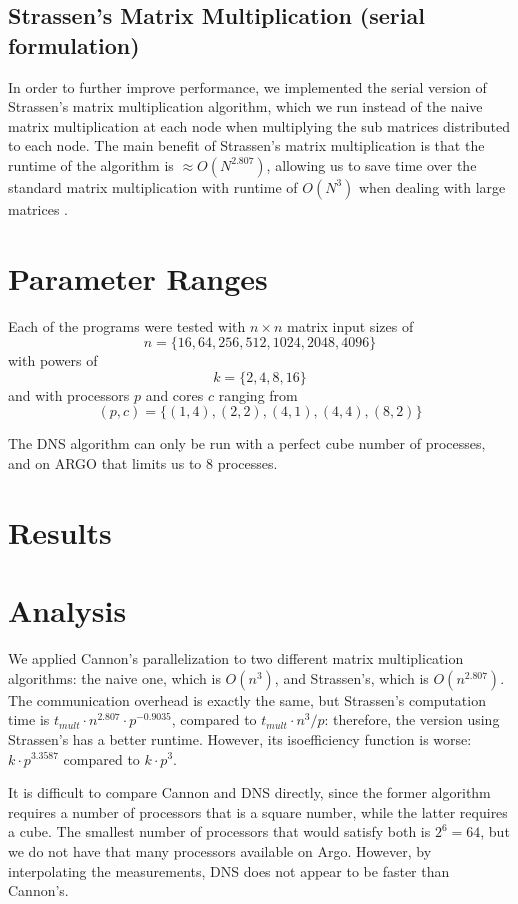 \documentclass{article}
\begin{document}
\subsection{Strassen's Matrix Multiplication (serial formulation)}

In order to further improve performance, we implemented the serial version of
Strassen's matrix multiplication algorithm, which we run instead of the naive
matrix multiplication at each node when multiplying the sub matrices distributed
to each node.  The main benefit of Strassen's matrix multiplication is that the
runtime of the algorithm is $\approx O(N^{2.807})$, allowing us to save time
over the standard matrix multiplication with runtime of $O(N^3)$ when dealing
with large matrices .

\section{Parameter Ranges}

Each of the programs were tested with $n \times n$ matrix input sizes of $$n =
\{ 16, 64, 256, 512, 1024, 2048, 4096 \}$$ with powers of $$k=\{ 2, 4, 8,
16 \}$$ and with processors $p$ and cores $c$ ranging from $$(p,c) = \{ (1,4),
(2,2), (4,1), (4,4), (8,2) \}$$

The DNS algorithm can only be run with a perfect cube number of processes, and
on ARGO that limits us to 8 processes.

\section{Results}



\section{Analysis}

We applied Cannon's parallelization to two different matrix multiplication algorithms: the naive one, which is $O(n^3)$, and Strassen's, which is $O(n^{2.807})$. The communication overhead is exactly the same, but Strassen's computation time is $t_{{mult}} \cdot n^{2.807} \cdot  p^{-0.9035}$, compared to $t_{mult} \cdot n^3 / p$: therefore, the version using Strassen's has a better runtime. However, its isoefficiency function is worse: $k \cdot p^{3.3587}$ compared to $k \cdot p^3$.

It is difficult to compare Cannon and DNS directly, since the former algorithm requires a number of processors
 that is a square number, while the latter requires a cube. The smallest number of processors that would satisfy both is $2^6 = 64$, but we do not have
 that many processors available on Argo. However, by interpolating the measurements, DNS does not appear to be faster than Cannon's.
\end{document}
